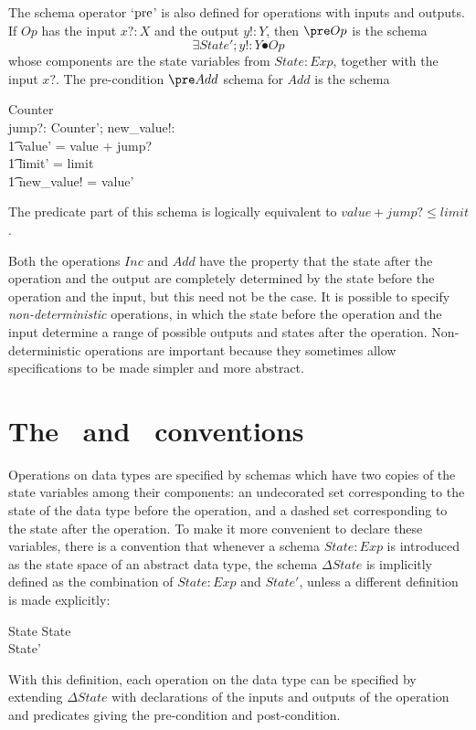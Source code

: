 The schema operator `$\rm pre$' is also defined for operations with
inputs and outputs. If $Op$ has the input $x?: X$ and the output
$y!: Y$, then $\pre Op$ is the schema
\[ \exists State'; y!: Y \spot Op \]
whose components are the state variables from $State: Exp $, together with
the input $x?$. The pre-condition $\pre Add$ schema for $Add$ is
the schema
\begin{schema*}
	Counter \\
	jump?: \nat
\where
	\exists Counter'; new\_value!: \nat \spot \\
\t1		value' = value + jump? \\
\t1		limit' = limit \\
\t1		new\_value! = value'
\end{schema*}
The predicate part of this schema is logically equivalent to
$value + jump? \leq limit$.

Both the operations $Inc$ and $Add$ have the property that the state after the
operation and the output are completely determined by the state before
the operation and the input, but this need not be the case.  It is
possible to specify {\em non-deterministic\/}%
operations, in which the state before the operation and the input
determine a range of possible outputs and states after the operation.
Non-deterministic operations are important because they sometimes
allow specifications to be made simpler and more
abstract.

\section{The \ and \ conventions}\label{s:deltaxi}

Operations on data types are
specified by schemas which have two copies of the state variables
among their components: an undecorated set corresponding to the
state of the data type before the operation, and a dashed set
corresponding to the state after the operation.  To make it more
convenient to declare these variables, there is a convention that
whenever a schema $State: Exp $ is introduced as the state space of an
abstract data type, the schema $\Delta State$\symdex{$\Delta$} is
implicitly defined as the combination of $State: Exp $ and $State'$,
unless a different definition is made explicitly:
\begin{schema}{\Delta State}
	State \\
	State'
\end{schema}
With this definition, each operation on the data type can be specified by
extending $\Delta State$ with declarations of the inputs and outputs of the
operation and predicates giving the pre-condition and post-condition.

